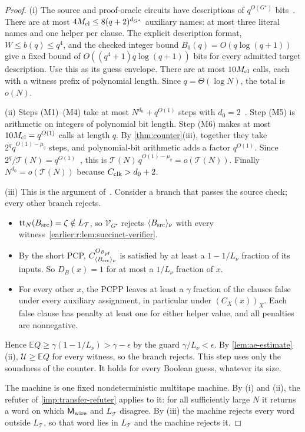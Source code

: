 \documentclass[11pt,letterpaper]{article}
\theoremstyle{definition}
\theoremstyle{remark}
\newcommand{\E}{\mathbb E}
\newcommand{\Tclk}{\mathcal T}
\begin{document}
\begin{proof}
(i) The source and proof-oracle circuits have descriptions of
\(q^{O(G^\star)}\) bits~\cite[Section~11.4]{NagCG}. There are at most
\(4M_{\rm cl}\le8(q+2)^{d_{G^\star}}\) auxiliary names: at most three literal
names and one helper per clause. The explicit description format,
\(W\le b(q)\le q^4\), and the checked integer bound
\(B_0(q)=O(q\log(q+1))\) give a fixed bound of
\(O((q^4+1)q\log(q+1))\) bits for every admitted target description.
Use this as its guess envelope. There are at most
\(10M_{\rm cl}\) calls, each with a witness prefix of polynomial
length. Since \(q=\Theta(\log N)\), the total is \(o(N)\).

(ii) Steps (M1)--(M4) take at most \(N^{d_0}+q^{O(1)}\) steps with
\(d_0=2\)~\cite[Section~11.4]{NagCG}. Step (M5) is arithmetic on
integers of polynomial bit length. Step (M6) makes at most
\(10M_{\rm cl}=q^{O(1)}\) calls at length \(q\). By
\cref{thm:counter}(iii), together they take \(2^qq^{O(1)-\mu_q}\)
steps, and polynomial-bit arithmetic adds a factor \(q^{O(1)}\). Since
\(2^q/\Tclk(N)=q^{O(1)}\)~\cite[Section~11.4 and Appendix~C]{NagCG},
this is \(\Tclk(N)\,q^{O(1)-\mu_q}=o(\Tclk(N))\). Finally
\(N^{d_0}=o(\Tclk(N))\) because \(C_{\rm clk}>d_0+2\).

(iii) This is the argument of~\cite[Section~11.4]{NagCG}. Consider a
branch that passes the source check; every other branch rejects.
\begin{itemize}
\item \(\mathrm{tt}_N(B_{\rm src})=\zeta\notin L_{\Tclk}\), so
\(\mathcal V_{G^\star}\) rejects \(\langle B_{\rm src}\rangle_\nu\) with
every witness~\cref{earlier:r:lem:succinct-verifier}.
\item By the short PCP, \(C^{O_{B_{\rm pf}}}_{\langle B_{\rm src}\rangle_\nu}\)
is satisfied by at least a \(1-1/L_\nu\) fraction of its inputs. So
\(D_B(x)=1\) for at most a \(1/L_\nu\) fraction of \(x\).
\item For every other \(x\), the PCPP leaves at least a \(\gamma\)
fraction of the clauses false under every auxiliary assignment, in
particular under \((C_X(x))_X\). Each false clause has penalty at least
one for either helper value, and all penalties are nonnegative.
\end{itemize}
Hence \(\E Q\ge\gamma(1-1/L_\nu)>\gamma-\epsilon\) by the guard
\(\gamma/L_\nu<\epsilon\). By \cref{lem:ae-estimate}(ii),
\(\mathcal U\ge\E Q\) for every witness, so the branch rejects. This
step uses only the soundness of the counter. It holds for every Boolean
guess, whatever its size.

The machine is one fixed nondeterministic multitape machine. By (i)
and (ii), the refuter of \cref{imp:transfer-refuter} applies to it: for all sufficiently large \(N\)
it returns a word on which \(\mathsf M_{\rm wire}\) and \(L_{\Tclk}\)
disagree. By (iii) the machine rejects every word outside
\(L_{\Tclk}\), so that word lies in \(L_{\Tclk}\) and the machine
rejects it.
\end{proof}
\end{document}
